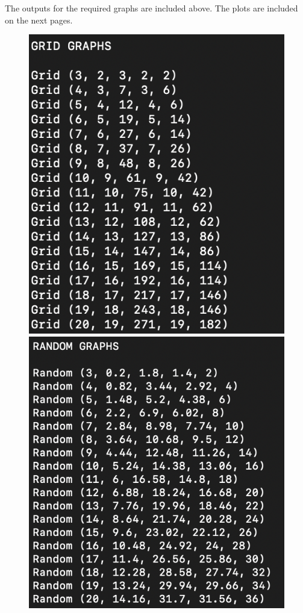 \documentclass[12pt]{article}
\begin{document}
\begin{enumerate}
The outputs for the required graphs are included above. The plots are included on the next pages.
\newline \smallskip
\begin{figure}
\begin{center}
\includegraphics[scale=0.6]{results1.png} 
\includegraphics[scale=0.6]{results2.png} 

\end{center}
\end{figure}
\end{enumerate}
\end{document}
